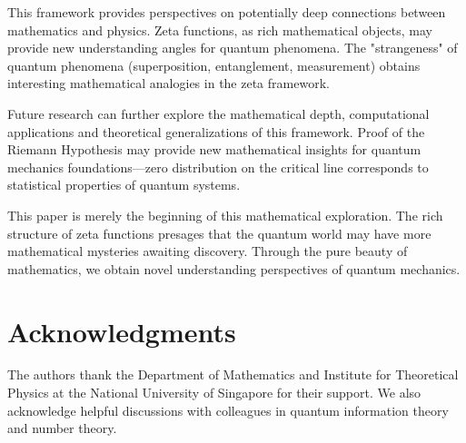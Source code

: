 \documentclass[11pt]{article}
\theoremstyle{plain}
\theoremstyle{definition}
\theoremstyle{remark}
\begin{document}
This framework provides perspectives on potentially deep connections between mathematics and physics. Zeta functions, as rich mathematical objects, may provide new understanding angles for quantum phenomena. The "strangeness" of quantum phenomena (superposition, entanglement, measurement) obtains interesting mathematical analogies in the zeta framework.

Future research can further explore the mathematical depth, computational applications and theoretical generalizations of this framework. Proof of the Riemann Hypothesis may provide new mathematical insights for quantum mechanics foundations—zero distribution on the critical line corresponds to statistical properties of quantum systems.

This paper is merely the beginning of this mathematical exploration. The rich structure of zeta functions presages that the quantum world may have more mathematical mysteries awaiting discovery. Through the pure beauty of mathematics, we obtain novel understanding perspectives of quantum mechanics.

\section*{Acknowledgments}

The authors thank the Department of Mathematics and Institute for Theoretical Physics at the National University of Singapore for their support. We also acknowledge helpful discussions with colleagues in quantum information theory and number theory.


\end{document}
